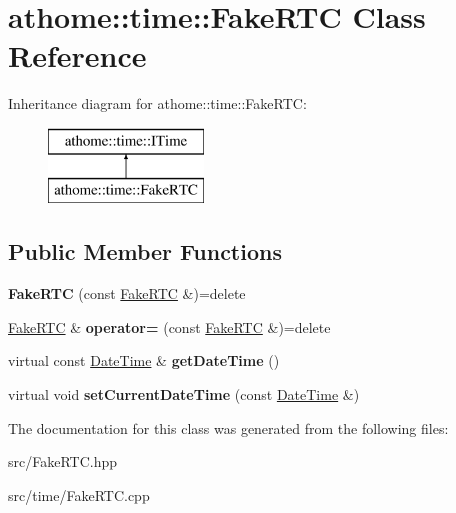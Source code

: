 \hypertarget{classathome_1_1time_1_1_fake_r_t_c}{}\section{athome\+:\+:time\+:\+:Fake\+R\+TC Class Reference}
\label{classathome_1_1time_1_1_fake_r_t_c}
Inheritance diagram for athome\+:\+:time\+:\+:Fake\+R\+TC\+:\begin{figure}[H]
\begin{center}
\leavevmode
\includegraphics[height=2.000000cm]{classathome_1_1time_1_1_fake_r_t_c}
\end{center}
\end{figure}
\subsection*{Public Member Functions}
\begin{DoxyCompactItemize}
\item 
\mbox{\label{classathome_1_1time_1_1_fake_r_t_c_a43e43ca95a5bbe16723030e1b67bd1ff}} 
{\bfseries Fake\+R\+TC} (const \mbox{\hyperlink{classathome_1_1time_1_1_fake_r_t_c}{Fake\+R\+TC}} \&)=delete
\item 
\mbox{\label{classathome_1_1time_1_1_fake_r_t_c_ac7add5dcf5c8ef8112fc53c2e9a32778}} 
\mbox{\hyperlink{classathome_1_1time_1_1_fake_r_t_c}{Fake\+R\+TC}} \& {\bfseries operator=} (const \mbox{\hyperlink{classathome_1_1time_1_1_fake_r_t_c}{Fake\+R\+TC}} \&)=delete
\item 
\mbox{\label{classathome_1_1time_1_1_fake_r_t_c_ad923e886207a50287d20a98131879c76}} 
virtual const \mbox{\hyperlink{structathome_1_1time_1_1_i_time_1_1_date_time}{Date\+Time}} \& {\bfseries get\+Date\+Time} ()
\item 
\mbox{\label{classathome_1_1time_1_1_fake_r_t_c_ab8565c9e7b300bf431cd0d636ad225b7}} 
virtual void {\bfseries set\+Current\+Date\+Time} (const \mbox{\hyperlink{structathome_1_1time_1_1_i_time_1_1_date_time}{Date\+Time}} \&)
\end{DoxyCompactItemize}


The documentation for this class was generated from the following files\+:\begin{DoxyCompactItemize}
\item 
src/Fake\+R\+T\+C.\+hpp\item 
src/time/Fake\+R\+T\+C.\+cpp\end{DoxyCompactItemize}
